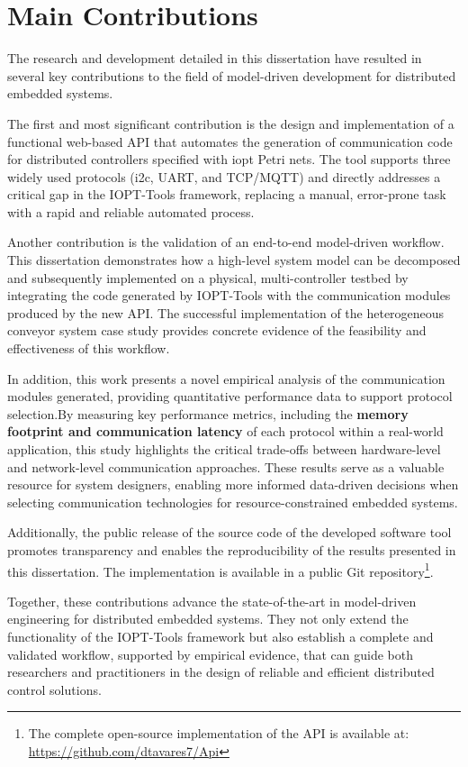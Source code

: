 \section{Main Contributions}
\label{sec:main_contributions}

The research and development detailed in this dissertation have resulted in several key contributions to the field of model-driven development for distributed embedded systems. 

The first and most significant contribution is the design and implementation of a functional web-based API that automates the generation of communication code for distributed controllers specified with \gls{iopt} Petri nets. The tool supports three widely used protocols (\gls{i2c}, UART, and TCP/MQTT) and directly addresses a critical gap in the IOPT-Tools framework, replacing a manual, error-prone task with a rapid and reliable automated process.

Another contribution is the validation of an end-to-end model-driven workflow. This dissertation demonstrates how a high-level system model can be decomposed and subsequently implemented on a physical, multi-controller testbed by integrating the code generated by IOPT-Tools with the communication modules produced by the new API. The successful implementation of the heterogeneous conveyor system case study provides concrete evidence of the feasibility and effectiveness of this workflow.

In addition, this work presents a novel empirical analysis of the communication modules generated, providing quantitative performance data to support protocol selection.By measuring key performance metrics, including the \textbf{memory footprint and communication latency}  of each protocol within a real-world application, this study highlights the critical trade-offs between hardware-level and network-level communication approaches. These results serve as a valuable resource for system designers, enabling more informed data-driven decisions when selecting communication technologies for resource-constrained embedded systems.

Additionally, the public release of the source code of the developed software tool promotes transparency and enables the reproducibility of the results presented in this dissertation. The implementation is available in a public Git repository\footnote{The complete open-source implementation of the API is available at: \url{https://github.com/dtavares7/Api}}.

Together, these contributions advance the state-of-the-art in model-driven engineering for distributed embedded systems. They not only extend the functionality of the IOPT-Tools framework but also establish a complete and validated workflow, supported by empirical evidence, that can guide both researchers and practitioners in the design of reliable and efficient distributed control solutions.


